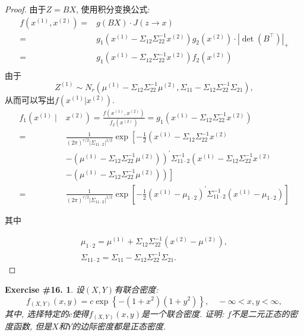 \documentclass[UTF8, a4paper]{article}
\newtheorem{exercise}{Exercise \#16.}
\begin{document}
\begin{proof}
由于\(Z = BX\), 使用积分变换公式: 
$$
\begin{aligned}
    f(x^{(1)}, x^{(2)}) =& g(BX) \cdot J(z \to x) \\
    =& g_1(x^{(1)} - \Sigma_{12} \Sigma_{22}^{-1} x^{(2)}) g_2(x^{(2)}) \cdot |\det(B^\top)|_+ \\
    =& g_1(x^{(1)} - \Sigma_{12} \Sigma_{22}^{-1} x^{(2)}) f_2(x^{(2)})  \\
\end{aligned}
$$
由于 
$$
Z^{(1)} \sim N_r(\mu^{(1)} - \Sigma_{12} \Sigma_{22}^{-1} \mu^{(2)}, \Sigma_{11} - \Sigma_{12}\Sigma_{22}^{-1}\Sigma_{21}),
$$
从而可以写出\(f(x^{(1)}|x^{(2)})\).  
$$
\begin{aligned}
f_1\left(x^{(1)} \mid\right. & \left.x^{(2)}\right)=\frac{f\left(x^{(1)}, x^{(2)}\right)}{f_2\left(x^{(2)}\right)}=g_1\left(x^{(1)}-\Sigma_{12} \Sigma_{22}^{-1} x^{(2)}\right) \\
= & \frac{1}{(2 \pi)^{r / 2}\left|\Sigma_{11 \cdot 2}\right|^{1 / 2}} \exp \left[-\frac{1}{2}\left(x^{(1)}-\Sigma_{12} \Sigma_{22}^{-1} x^{(2)}\right.\right. \\
& \left.-\left(\mu^{(1)}-\Sigma_{12} \Sigma_{22}^{-1} \mu^{(2)}\right)\right)^{\prime} \Sigma_{11 \cdot 2}^{-1}\left(x^{(1)}-\Sigma_{12} \Sigma_{22}^{-1} x^{(2)}\right. \\
& \left.\left.-\left(\mu^{(1)}-\Sigma_{12} \Sigma_{22}^{-1} \mu^{(2)}\right)\right)\right] \\
= & \frac{1}{(2 \pi)^{r / 2}\left|\Sigma_{11 \cdot 2}\right|^{1 / 2}} \exp \left[-\frac{1}{2}\left(x^{(1)}-\mu_{1 \cdot 2}\right)^{\prime} \Sigma_{11 \cdot 2}^{-1}\left(x^{(1)}-\mu_{1 \cdot 2}\right)\right]
\end{aligned}
$$


其中

$$
\begin{gathered}
\mu_{1 \cdot 2}=\mu^{(1)}+\Sigma_{12} \Sigma_{22}^{-1}\left(x^{(2)}-\mu^{(2)}\right), \\
\Sigma_{11 \cdot 2}=\Sigma_{11}-\Sigma_{12} \Sigma_{22}^{-1} \Sigma_{21} .
\end{gathered}
$$
\end{proof}




\begin{framed}
\begin{exercise}
设\((X,Y)\)有联合密度:
$$
f_{(X, Y)}(x, y)=c \exp \left\{-\left(1+x^2\right)\left(1+y^2\right)\right\}, \quad-\infty<x, y<\infty,
$$
其中, 选择特定的\(c\)使得\(f_{(X, Y)}(x, y)\)是一个联合密度.
证明: \(f\){\it 不是}二元正态的密度函数, 但是\(X\)和\(Y\)的边际密度都是正态密度.
\end{exercise}
\end{framed}
\end{document}
